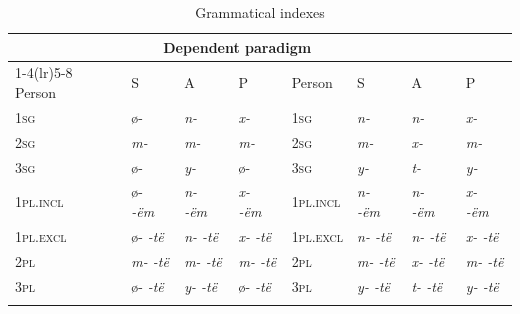 \documentclass[output=paper,colorlinks,citecolor=brown,draft]{langscibook}
\begin{document}
\begin{table}[b]
\begin{tabularx}{\textwidth}{lllX llll}
\lsptoprule
\multicolumn{4}{c}{{Independent paradigm}} & \multicolumn{4}{c}{{Dependent paradigm}}\\
\cmidrule(lr){1-4}\cmidrule(lr){5-8}
{Person} & {S} & {A} & {P} & {Person} & {S} & {A} & {P}\\
\midrule
\textsc{1sg} & {ø-} & \textit{n-} & \textit{x-} & \textsc{1sg} & \textit{n-} & \textit{n-} & \textit{x-}\\
\textsc{2sg} & \textit{m-} & \textit{m-} & \textit{m-} & \textsc{2sg} & \textit{m-} & \textit{x-} & \textit{m-}\\
\textsc{3sg} & {ø-} & \textit{y-} & {ø-} & \textsc{3sg} & \textit{y-} & \textit{t-} & \textit{y-}\\
\textsc{1pl.incl} & {ø- {}\textit{-ëm}} & \textit{n- {}-ëm} & \textit{x- {}-ëm} & \textsc{1pl.incl} & \textit{n- {}-ëm} & \textit{n- {}-ëm} & \textit{x- {}-ëm}\\
\textsc{1pl.excl} & {ø- {}\textit{-të}} & \textit{n- {}-të} & \textit{x- {}-të} & \textsc{1pl.excl} & \textit{n- {}-të} & \textit{n- {}-të} & \textit{x- {}-të}\\
\textsc{2pl} & \textit{m- {}-të} & \textit{m- {}-të} & \textit{m- {}-të} & \textsc{2pl} & \textit{m- {}-të} & \textit{x- {}-të} & \textit{m- {}-të}\\
\textsc{3pl} & {ø- {}\textit{-të}} & \textit{y- {}-të} & {ø- {}\textit{-të}} & \textsc{3pl} & \textit{y- {}-të} & \textit{t- {}-të} & \textit{y- {}-të}\\
\lspbottomrule
\end{tabularx}
\caption{Grammatical indexes}
\label{tab:mix:2}
\end{table}
\end{document}
